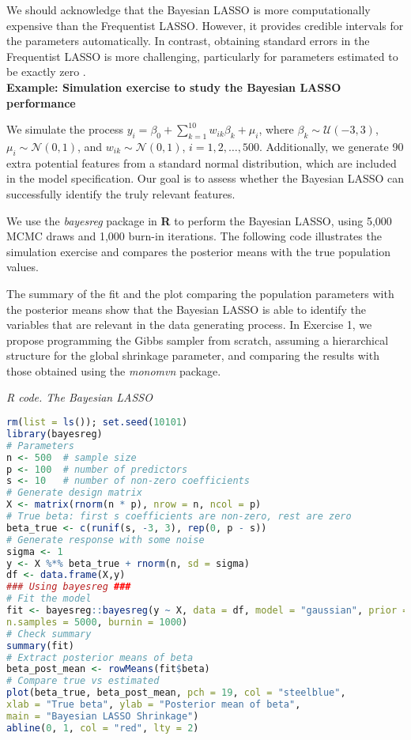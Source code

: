 We should acknowledge that the Bayesian LASSO is more computationally expensive than the Frequentist LASSO. However, it provides credible intervals for the parameters automatically. In contrast, obtaining standard errors in the Frequentist LASSO is more challenging, particularly for parameters estimated to be exactly zero \cite{kyung2010penalized}.\\

\textbf{Example: Simulation exercise to study the Bayesian LASSO performance}

We simulate the process \( y_i = \beta_0 + \sum_{k=1}^{10} w_{ik} \beta_k + \mu_i \), where \( \beta_k \sim \mathcal{U}(-3, 3) \), \( \mu_i \sim \mathcal{N}(0, 1) \), and \( w_{ik} \sim \mathcal{N}(0, 1) \), $i=1,2,\dots,500$. Additionally, we generate 90 extra potential features from a standard normal distribution, which are included in the model specification. Our goal is to assess whether the Bayesian LASSO can successfully identify the truly relevant features.

We use the \textit{bayesreg} package in \textbf{R} to perform the Bayesian LASSO, using 5,000 MCMC draws and 1,000 burn-in iterations. The following code illustrates the simulation exercise and compares the posterior means with the true population values.

The summary of the fit and the plot comparing the population parameters with the posterior means show that the Bayesian LASSO is able to identify the variables that are relevant in the data generating process. In Exercise 1, we propose programming the Gibbs sampler from scratch, assuming a hierarchical structure for the global shrinkage parameter, and comparing the results with those obtained using the \textit{monomvn} package.

\begin{tcolorbox}[enhanced,width=4.67in,center upper,
	fontupper=\large\bfseries,drop shadow southwest,sharp corners]
	\textit{R code. The Bayesian LASSO}
	\begin{VF}
		\begin{lstlisting}[language=R]
rm(list = ls()); set.seed(10101)
library(bayesreg)
# Parameters
n <- 500  # sample size
p <- 100  # number of predictors
s <- 10   # number of non-zero coefficients
# Generate design matrix
X <- matrix(rnorm(n * p), nrow = n, ncol = p)
# True beta: first s coefficients are non-zero, rest are zero
beta_true <- c(runif(s, -3, 3), rep(0, p - s))
# Generate response with some noise
sigma <- 1
y <- X %*% beta_true + rnorm(n, sd = sigma)
df <- data.frame(X,y)
### Using bayesreg ###
# Fit the model
fit <- bayesreg::bayesreg(y ~ X, data = df, model = "gaussian", prior = "lasso", 
n.samples = 5000, burnin = 1000)
# Check summary
summary(fit)
# Extract posterior means of beta
beta_post_mean <- rowMeans(fit$beta)
# Compare true vs estimated
plot(beta_true, beta_post_mean, pch = 19, col = "steelblue",
xlab = "True beta", ylab = "Posterior mean of beta",
main = "Bayesian LASSO Shrinkage")
abline(0, 1, col = "red", lty = 2)
\end{lstlisting}
	\end{VF}
\end{tcolorbox}
  
